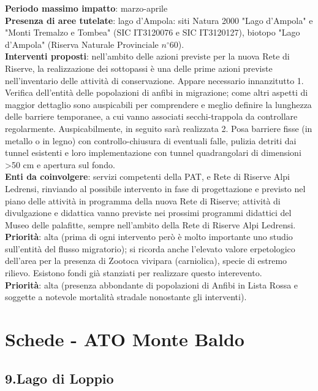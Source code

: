 \documentclass[11pt,a4paper,twoside]{memoir}
\begin{document}
\textbf{Periodo massimo impatto}: marzo-aprile \\
\textbf{Presenza di aree tutelate}: lago d'Ampola: siti Natura 2000 "Lago d'Ampola" e "Monti Tremalzo e Tombea" (SIC IT3120076 e SIC IT3120127), biotopo "Lago d'Ampola" (Riserva Naturale Provinciale $n^{\circ}$60). \\
\textbf{Interventi proposti}: nell’ambito delle azioni previste per la nuova Rete di Riserve, la realizzazione dei sottopassi è una delle prime azioni previste nell’inventario delle attività di conservazione. Appare necessario innanzitutto 1. Verifica dell'entità delle popolazioni di anfibi in migrazione; come altri aspetti di maggior dettaglio sono auspicabili per comprendere e meglio definire la lunghezza delle barriere temporanee, a cui vanno associati secchi-trappola da controllare regolarmente. Auspicabilmente, in seguito sarà realizzata 2. Posa barriere fisse (in metallo o in legno) con controllo-chiusura di eventuali falle, pulizia detriti dai tunnel esistenti e loro implementazione con tunnel quadrangolari di dimensioni >50 cm e apertura sul fondo. \\
\textbf{Enti da coinvolgere}: servizi competenti della PAT, e Rete di Riserve Alpi Ledrensi, rinviando al possibile intervento in fase di progettazione e previsto nel piano delle attività in programma della nuova Rete di Riserve; attività di divulgazione e didattica vanno previste nei prossimi programmi didattici del Museo delle palafitte, sempre nell’ambito della Rete di Riserve Alpi Ledrensi. \\
\textbf{Priorità}: alta (prima di ogni intervento però è molto importante uno studio sull'entità del flusso migratorio); si ricorda anche l’elevato valore erpetologico dell’area per la presenza di Zootoca vivipara (carniolica), specie di estremo rilievo. Esistono fondi già stanziati per realizzare questo interevento. \\
\textbf{Priorità}: alta (presenza abbondante di popolazioni di Anfibi in Lista Rossa e soggette a notevole mortalità stradale nonostante gli interventi). \\

\newpage
\section{Schede - ATO Monte Baldo}
\begin{tcolorbox}[breakable,colback=white,colframe=green,width=10cm]
\subsection{9.Lago di Loppio}
\end{tcolorbox}
\end{document}
